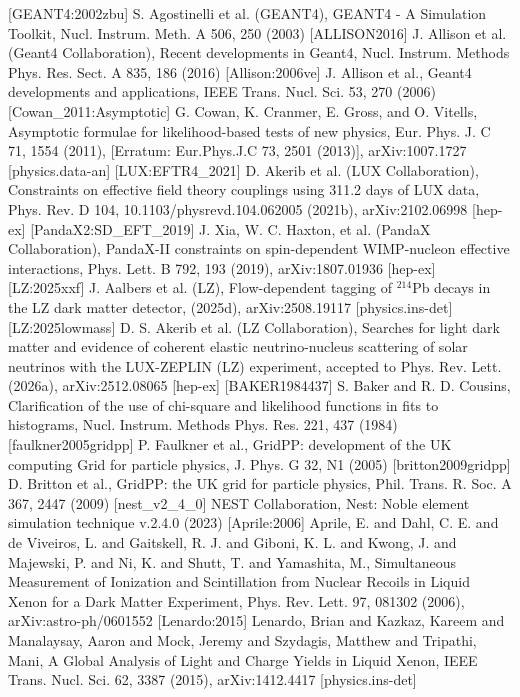[GEANT4:2002zbu] S. Agostinelli et al. (GEANT4), GEANT4 - A Simulation Toolkit, Nucl. Instrum. Meth. A 506, 250 (2003)
[ALLISON2016] J. Allison et al. (Geant4 Collaboration), Recent developments in Geant4, Nucl. Instrum. Methods Phys. Res. Sect. A 835, 186 (2016)
[Allison:2006ve] J. Allison et al., Geant4 developments and applications, IEEE Trans. Nucl. Sci. 53, 270 (2006)
[Cowan_2011:Asymptotic] G. Cowan, K. Cranmer, E. Gross, and O. Vitells, Asymptotic formulae for likelihood-based tests of new physics, Eur. Phys. J. C 71, 1554 (2011), [Erratum: Eur.Phys.J.C 73, 2501 (2013)], arXiv:1007.1727 [physics.data-an]
[LUX:EFTR4_2021] D. Akerib et al. (LUX Collaboration), Constraints on effective field theory couplings using 311.2 days of LUX data, Phys. Rev. D 104, 10.1103/physrevd.104.062005 (2021b), arXiv:2102.06998 [hep-ex]
[PandaX2:SD_EFT_2019] J. Xia, W. C. Haxton, et al. (PandaX Collaboration), PandaX-II constraints on spin-dependent WIMP-nucleon effective interactions, Phys. Lett. B 792, 193 (2019), arXiv:1807.01936 [hep-ex]
[LZ:2025xxf] J. Aalbers et al. (LZ), Flow-dependent tagging of $^214$Pb decays in the LZ dark matter detector, (2025d), arXiv:2508.19117 [physics.ins-det]
[LZ:2025lowmass] D. S. Akerib et al. (LZ Collaboration), Searches for light dark matter and evidence of coherent elastic neutrino-nucleus scattering of solar neutrinos with the LUX-ZEPLIN (LZ) experiment, accepted to Phys. Rev. Lett. (2026a), arXiv:2512.08065 [hep-ex]
[BAKER1984437] S. Baker and R. D. Cousins, Clarification of the use of chi-square and likelihood functions in fits to histograms, Nucl. Instrum. Methods Phys. Res. 221, 437 (1984)
[faulkner2005gridpp] P. Faulkner et al., GridPP: development of the UK computing Grid for particle physics, J. Phys. G 32, N1 (2005)
[britton2009gridpp] D. Britton et al., GridPP: the UK grid for particle physics, Phil. Trans. R. Soc. A 367, 2447 (2009)
[nest_v2_4_0] NEST Collaboration, Nest: Noble element simulation technique v.2.4.0 (2023)
[Aprile:2006] Aprile, E. and Dahl, C. E. and de Viveiros, L. and Gaitskell, R. J. and Giboni, K. L. and Kwong, J. and Majewski, P. and Ni, K. and Shutt, T. and Yamashita, M., Simultaneous Measurement of Ionization and Scintillation from Nuclear Recoils in Liquid Xenon for a Dark Matter Experiment, Phys. Rev. Lett. 97, 081302 (2006), arXiv:astro-ph/0601552
[Lenardo:2015] Lenardo, Brian and Kazkaz, Kareem and Manalaysay, Aaron and Mock, Jeremy and Szydagis, Matthew and Tripathi, Mani, A Global Analysis of Light and Charge Yields in Liquid Xenon, IEEE Trans. Nucl. Sci. 62, 3387 (2015), arXiv:1412.4417 [physics.ins-det]
